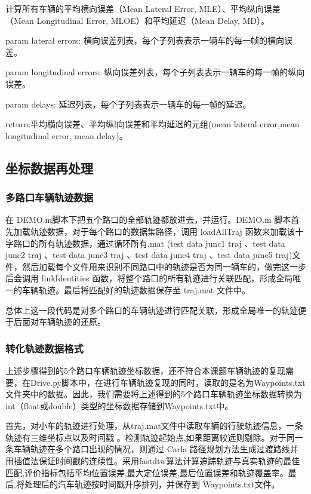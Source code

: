 计算所有车辆的平均横向误差（Mean Lateral Error, MLE）、平均纵向误差（Mean Longitudinal Error, MLOE）和平均延迟（Mean Delay, MD）。

param lateral errors: 横向误差列表，每个子列表表示一辆车的每一帧的横向误差。

param longitudinal errors: 纵向误差列表，每个子列表表示一辆车的每一帧的纵向误差。

param delays: 延迟列表，每个子列表表示一辆车的每一帧的延迟。

return:平均横向误差、平均纵l向误差和平均延迟的元组(mean lateral error,mean longitudinal error, mean delay)。


\subsection{坐标数据再处理}
\subsubsection{多路口车辆轨迹数据}



在 DEMO.m脚本下把五个路口的全部轨迹都放进去，并运行。DEMO.m 脚本首先加载轨迹数据，对于每个路口的数据集路径，调用 loadAllTraj 函数来加载该十字路口的所有轨迹数据，通过循环所有.mat (test data junc1 traj 、test data junc2  traj 、test data junc3 traj 、test   data junc4 traj 、test data junc5 traj)文件，然后加载每个文件用来识别不同路口中的轨迹是否为同一辆车的，做完这一步后会调用 linkIdentities 函数，将整个路口的所有轨迹进行关联匹配，形成全局唯一的车辆轨迹。最后将匹配好的轨迹数据保存至 traj.mat 文件中。

总体上这一段代码是对多个路口的车辆轨迹进行匹配关联，形成全局唯一的轨迹便于后面对车辆轨迹的还原。








\subsubsection{转化轨迹数据格式}
上述步骤得到的5个路口车辆轨迹坐标数据，还不符合本课题车辆轨迹的复现需要，在Drive.py脚本中，在进行车辆轨迹复现的同时，读取的是名为Waypoints.txt文件夹中的数据。因此，我们需要将上述得到的5个路口车辆轨迹坐标数据转换为int（float或double）类型的坐标数据存储到Waypoints.txt中。

首先，对小车的轨迹进行处理，从traj.mat文件中读取车辆的行驶轨迹信息，一条轨迹有三维坐标点以及时间戳 。检测轨迹起始点,如果距离较远则剔除。对于同一条车辆轨迹在多个路口出现的情况，则通过 Carla 路径规划方法生成过渡路线并用插值法保证时间戳的连续性。采用fastdtw算法计算追踪轨迹与真实轨迹的最佳匹配,评价指标包括平均位置误差,最大定位误差,最后位置误差和轨迹覆盖率。最后,将处理后的汽车轨迹按时间戳升序排列，并保存到 Waypoints.txt文件。











